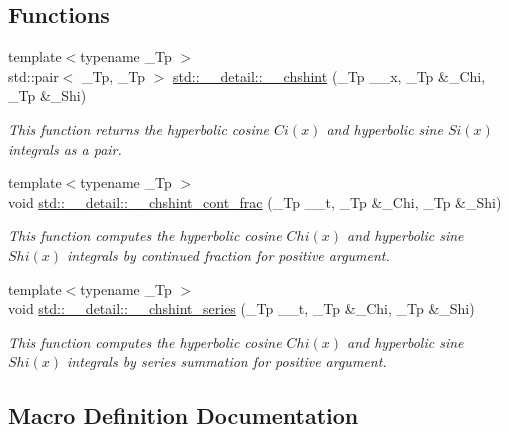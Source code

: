 \subsection*{Functions}
\begin{DoxyCompactItemize}
\item 
{\footnotesize template$<$typename \+\_\+\+Tp $>$ }\\std\+::pair$<$ \+\_\+\+Tp, \+\_\+\+Tp $>$ \hyperlink{namespacestd_1_1____detail_aa07abc4dac6cf589ccd12d3ce40277cf}{std\+::\+\_\+\+\_\+detail\+::\+\_\+\+\_\+chshint} (\+\_\+\+Tp \+\_\+\+\_\+x, \+\_\+\+Tp \&\+\_\+\+Chi, \+\_\+\+Tp \&\+\_\+\+Shi)
\begin{DoxyCompactList}\small\item\em This function returns the hyperbolic cosine $ Ci(x) $ and hyperbolic sine $ Si(x) $ integrals as a pair. \end{DoxyCompactList}\item 
{\footnotesize template$<$typename \+\_\+\+Tp $>$ }\\void \hyperlink{namespacestd_1_1____detail_a07da2303d36d77bfad393a7b8ebdf686}{std\+::\+\_\+\+\_\+detail\+::\+\_\+\+\_\+chshint\+\_\+cont\+\_\+frac} (\+\_\+\+Tp \+\_\+\+\_\+t, \+\_\+\+Tp \&\+\_\+\+Chi, \+\_\+\+Tp \&\+\_\+\+Shi)
\begin{DoxyCompactList}\small\item\em This function computes the hyperbolic cosine $ Chi(x) $ and hyperbolic sine $ Shi(x) $ integrals by continued fraction for positive argument. \end{DoxyCompactList}\item 
{\footnotesize template$<$typename \+\_\+\+Tp $>$ }\\void \hyperlink{namespacestd_1_1____detail_a16055b6e4baa35ffe5c6d9495d9d0158}{std\+::\+\_\+\+\_\+detail\+::\+\_\+\+\_\+chshint\+\_\+series} (\+\_\+\+Tp \+\_\+\+\_\+t, \+\_\+\+Tp \&\+\_\+\+Chi, \+\_\+\+Tp \&\+\_\+\+Shi)
\begin{DoxyCompactList}\small\item\em This function computes the hyperbolic cosine $ Chi(x) $ and hyperbolic sine $ Shi(x) $ integrals by series summation for positive argument. \end{DoxyCompactList}\end{DoxyCompactItemize}


\subsection{Macro Definition Documentation}
\hypertarget{sf__hypint_8tcc_acf643c2e2a7b3fab7ab4a8be18e29584}{}

